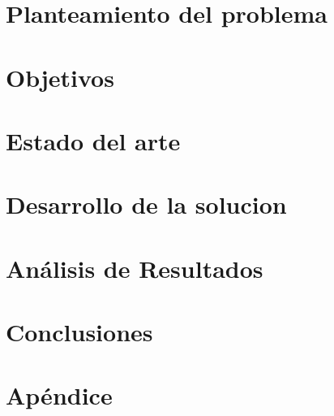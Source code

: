 \documentclass[book,spanish,a4paper,12pt]{tfg}
\begin{document}
\chapter{Planteamiento del problema}


\chapter{Objetivos}


\chapter{Estado del arte}


\chapter{Desarrollo de la solucion}


\chapter{Análisis de Resultados}


\chapter{Conclusiones}



\pagestyle{appendix}

\appendix
\chapter{Apéndice}




\end{document}

